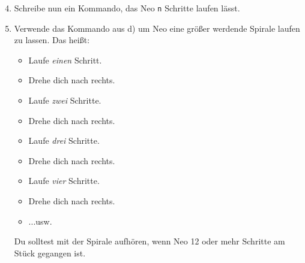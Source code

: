 \begin{enumerate}\setcounter{enumi}{3}
	\item
		Schreibe nun ein Kommando, das Neo \lstinline{n} Schritte laufen lässt.

	\item
		Verwende das Kommando aus d) um Neo eine größer werdende Spirale laufen zu lassen.
		Das heißt:

		\begin{itemize}
			\item[] Laufe \emph{einen} Schritt.
			\item[] Drehe dich nach rechts.
			\item[] Laufe \emph{zwei} Schritte.
			\item[] Drehe dich nach rechts.
			\item[] Laufe \emph{drei} Schritte.
			\item[] Drehe dich nach rechts.
			\item[] Laufe \emph{vier} Schritte.
			\item[] Drehe dich nach rechts.
			\item[] ...usw.
		\end{itemize}

		Du solltest mit der Spirale aufhören, wenn Neo 12 oder mehr Schritte am Stück gegangen ist.
\end{enumerate}

\newpage
